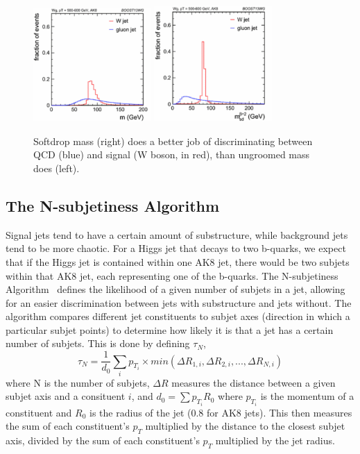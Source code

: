 \begin{figure}[h!]
    \centering
        \includegraphics[width=0.4\textwidth]{F4/ungroomed.PNG}
        \includegraphics[width=0.4\textwidth]{F4/sd.PNG}
        \caption{Softdrop mass (right) does a better job of discriminating between QCD (blue) and signal (W boson, in red), than ungroomed mass does (left).}
        \label{Fig:Tag:SD}
\end{figure}

\vspace{5mm}
\subsection{The N-subjetiness Algorithm}

Signal jets tend to have a certain amount of substructure, while background jets tend to be more chaotic. For a Higgs jet that decays to two b-quarks, we expect that if the Higgs jet is contained within one AK8 jet, there would be two subjets within that AK8 jet, each representing one of the b-quarks.  The N-subjetiness Algorithm~\cite{Thaler:2010tr,Thaler:2011gf} defines the likelihood of a given number of subjets in a jet, allowing for an easier discrimination between jets with substructure and jets without. The algorithm compares different jet constituents to subjet axes (direction in which a particular subjet points) to determine how likely it is that a jet has a certain number of subjets. This is done by defining $\tau_N$, 
\begin{equation}
\tau_N = \frac{1}{d_0}\sum_i p_{T_i}\times min(\Delta R_{1,i},\Delta R_{2,i},...,\Delta R_{N,i})
\end{equation}
where N is the number of subjets, $\Delta R$ measures the distance between a given subjet axis and a consituent $i$, and $d_0 = \sum p_{T_i} R_0$ where $p_{T_i}$ is the momentum of a constituent and $R_0$ is the radius of the jet (0.8 for AK8 jets). This then measures the sum of each constituent's $p_{T}$ multiplied by the distance to the closest subjet axis, divided by the sum of each constituent's $p_{T}$ multiplied by the jet radius. 

